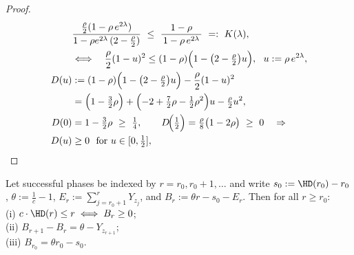 \begin{proof}
\begin{align*}
		&\frac{\tfrac{\rho}{2}(1-\rho\,e^{2\lambda})}{1-\rho e^{2\lambda}\,(2-\tfrac{\rho}{2})}
		\  \le\ \frac{1-\rho}{\,1-\rho\,e^{2\lambda}\,}
		\ =:\ K(\lambda),
		\\&\Longleftrightarrow\quad
		\frac{\rho}{2}(1-u)^2 \le (1-\rho)\Bigl(1-\bigl(2-\tfrac{\rho}{2}\bigr)u\Bigr),\ \ u:=\rho\,e^{2\lambda},
		\\
		D(u)
		&:=(1-\rho)\Bigl(1-\bigl(2-\tfrac{\rho}{2}\bigr)u\Bigr)-\frac{\rho}{2}(1-u)^2
		\\&= \Bigl(1-\tfrac{3}{2}\rho\Bigr)+\Bigl(-2+\tfrac{7}{2}\rho-\tfrac{1}{2}\rho^2\Bigr)u-\tfrac{\rho}{2}u^2,
		\\
		D(0)&=1-\tfrac{3}{2}\rho\ \ge\ \tfrac14,\qquad
		D\!\Big(\tfrac12\Big)=\tfrac{\rho}{8}\bigl(1-2\rho\bigr)\ \ge\ 0
		\quad\Rightarrow\quad \\
		D(u)&\ge 0\ \text{ for }u\in[0,\tfrac12],
	\end{align*}
	
	
\end{proof}
\begin{lemma}\label{lem:buffer}
	Let successful phases be indexed by $r=r_0,r_0+1,\dots$ and write
	$s_0:=\HD(r_0)-r_0$, $\theta:=\tfrac{1}{c}-1$, 
	$E_r:=\sum_{j=r_0+1}^{r} Y_{z_j}$, and 
	$B_r:=\theta r - s_0 - E_r$.
	Then for all $r\ge r_0:$  \\
	(i) $c\cdot\HD(r)\le r \iff B_r\ge 0$; \\
	(ii) $B_{r+1}-B_r=\theta-Y_{z_{r+1}}$; \\
	(iii) $B_{r_0}=\theta r_0 - s_0$. 
\end{lemma}

